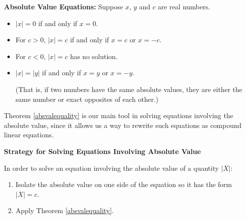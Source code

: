 \documentclass{ximera}
\begin{document}
\begin{theorem} \textbf{Absolute Value Equations: }\label{absvalequality}  Suppose $x$, $y$ and $c$ are real numbers.

\begin{itemize}

\item  $|x| = 0$ if and only if $x = 0$.

\item  For $c > 0$, $|x| = c$ if and only if $x = c$ or $x = -c$.

\item  For $c < 0$, $|x| = c$ has no solution.

\item  $|x| = |y|$ if and only if $x = y$ or $x = -y$. 

(That is,  if two numbers have the same absolute values, they are either the same number or exact opposites of each other.) 

\end{itemize}

\end{theorem}


\medskip

Theorem \ref{absvalequality} is our main tool in solving equations involving the absolute value, since it allows us a way to rewrite such equations as compound linear equations.

\medskip

\label{strategyforsolvingabseqns}


\centerline{\textbf{Strategy for Solving Equations Involving Absolute Value}}

\vspace{0.05in}

In order to solve an equation involving the absolute value of a quantity $|X|$:

\begin{enumerate}

\item  Isolate the absolute value on one side of the equation so it has the form $|X| = c$.

\item  Apply Theorem \ref{absvalequality}.

\end{enumerate}


\smallskip
\end{document}
